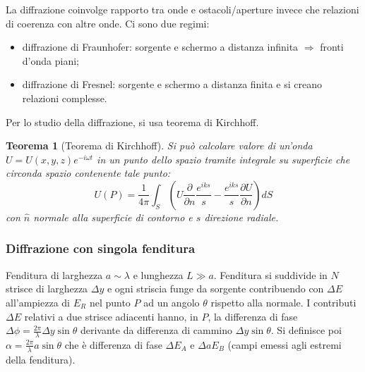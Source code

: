 \documentclass[a4paper]{scrartcl}
\numberwithin{equation}{subsection}
\theoremstyle{style1}
\newtheorem{teorema}{Teorema}[section]
\begin{document}
La diffrazione coinvolge rapporto tra onde e ostacoli/aperture invece che relazioni di coerenza con altre onde. Ci sono due regimi:
\begin{itemize}
	\item diffrazione di Fraunhofer: sorgente e schermo a distanza infinita $\Rightarrow $ fronti d'onda piani;
	\item diffrazione di Fresnel: sorgente e schermo a distanza finita e si creano relazioni complesse.
\end{itemize}
Per lo studio della diffrazione, si usa teorema di Kirchhoff.
\begin{teorema}
	[Teorema di Kirchhoff]
	Si pu\`o calcolare valore di un'onda $U=U(x,y,z) e^{-i\omega t} $ in un punto dello spazio tramite integrale su superficie che circonda spazio contenente tale punto:
	\begin{equation}
		U(P) = \frac{1}{4\pi} \int_{S}  \left(U \frac{\partial }{\partial n} \frac{e^{iks} }{s} - \frac{e^{iks} }{s}\frac{\partial U}{\partial n}  \right) dS
	\end{equation}
	con $\hat{n}$ normale alla superficie di contorno e $s$ direzione radiale.
\end{teorema}
\subsubsection{Diffrazione con singola fenditura}

Fenditura di larghezza $a\sim \lambda $ e lunghezza $L\gg a$. Fenditura si suddivide in $N$ strisce di larghezza $\Delta  y$ e ogni striscia funge da sorgente contribuendo con $\Delta E$ all'ampiezza di $E_R$ nel punto $P$ ad un angolo $\theta $ rispetto alla normale. I contributi $\Delta  E$ relativi a due strisce adiacenti hanno, in $P$, la differenza di fase $\Delta \phi  = \frac{2\pi}{\lambda }\Delta  y \sin \theta $ derivante da differenza di cammino $\Delta  y \sin \theta $. Si definisce poi $\alpha  = \frac{2\pi}{\lambda } a \sin \theta $ che \`e differenza di fase $\Delta E_A $ e $\Delta a E_B$ (campi emessi agli estremi della fenditura). 
\end{document}
